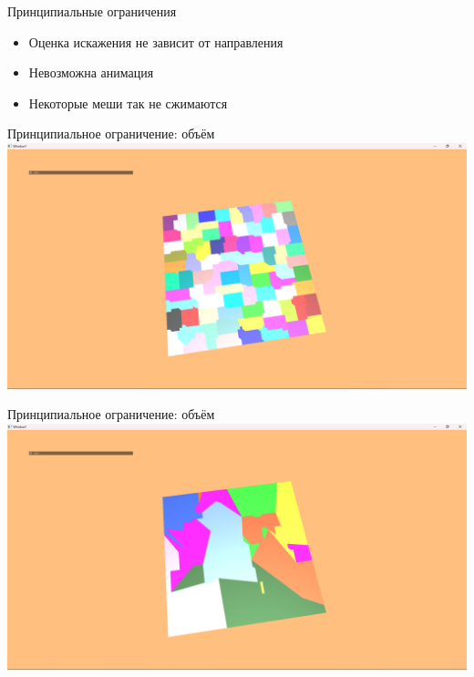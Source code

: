 \begin{frame}{Принципиальные ограничения}
    \begin{itemize}
        \item Оценка искажения не зависит от направления
        \item Невозможна анимация
        \item Некоторые меши так не сжимаются
    \end{itemize}
\end{frame}

\begin{frame}{Принципиальное ограничение: объём}
    \includegraphics[width=\textwidth]{plane0.png}
\end{frame}

\begin{frame}{Принципиальное ограничение: объём}
    \includegraphics[width=\textwidth]{plane1.png}
\end{frame}
